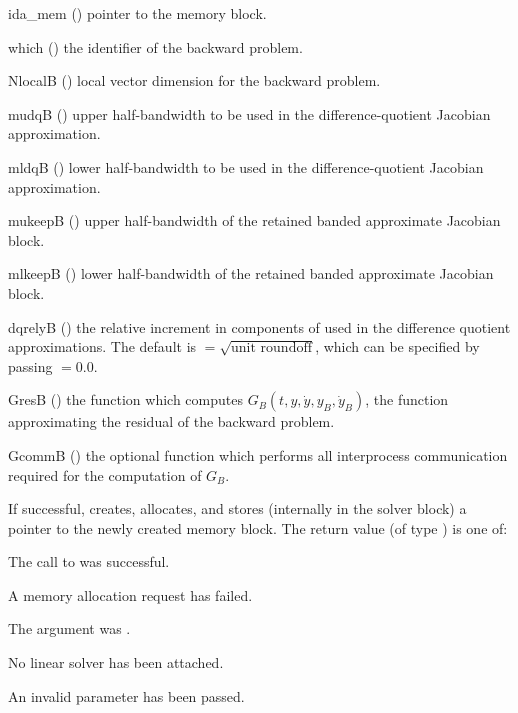 {
  \begin{args}
  \item[ida\_mem] ()
    pointer to the {\idas} memory block.
  \item[which] ()
    the identifier of the backward problem.
  \item[NlocalB] ()
    local vector dimension for the backward problem.
  \item[mudqB] ()
    upper half-bandwidth to be used in the difference-quotient Jacobian approximation.
  \item[mldqB] ()
    lower half-bandwidth to be used in the difference-quotient Jacobian approximation.
  \item[mukeepB] ()
    upper half-bandwidth of the retained banded approximate Jacobian block.
  \item[mlkeepB] ()
    lower half-bandwidth of the retained banded approximate Jacobian block.
  \item[dqrelyB] ()
    the relative increment in components of  used in the difference quotient
    approximations.  The default is $ = \sqrt{\text{unit roundoff}}$, which
    can be specified by passing $ = 0.0$.
  \item[GresB] ()
    the {\C} function which computes $G_B(t,y,\dot y, y_B, \dot y_B)$, the
    function approximating the residual of the backward problem. 
  \item[GcommB] ()
    the optional {\C} function which performs all interprocess communication required for
    the computation of $G_B$.
  \end{args}
}
{
  If successful,  creates, allocates, and stores (internally
  in the {\idas} solver block) a pointer to the newly created 
  {\idabbdpre} memory block.
  The return value  (of type ) is one of:
  \begin{args}
  \item[\Id{IDASPILS\_SUCCESS}]
    The call to  was successful.
  \item[\Id{IDASPILS\_MEM\_FAIL}]
    A memory allocation request has failed.
  \item[\Id{IDASPILS\_MEM\_NULL}]
    The  argument was .
  \item[\Id{IDASPILS\_LMEM\_NULL}]
    No linear solver has been attached.
  \item[\Id{IDASPILS\_ILL\_INPUT}]
    An invalid parameter has been passed.
  \end{args}
}
